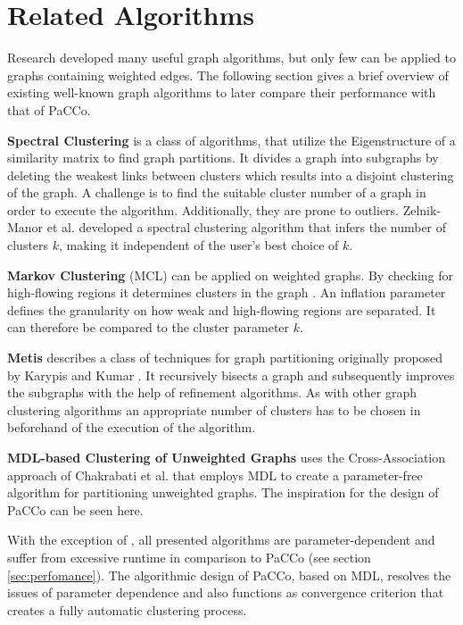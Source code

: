 \documentclass[12pt,journal,compsoc]{IEEEtran}
\numberwithin{equation}{section}
\begin{document}

\section{Related Algorithms}
\label{sec:relatedAlgorithms}
Research developed many useful graph algorithms, but only few can be applied to graphs containing weighted edges. The following section gives a brief overview of existing well-known graph algorithms to later compare their performance with that of PaCCo.

\textbf{Spectral Clustering} is a class of algorithms, that utilize the Eigenstructure of a similarity matrix to find graph partitions. It divides a graph into subgraphs by deleting the weakest links between clusters which results into a disjoint clustering of the graph. A challenge is to find the suitable cluster number of a graph in order to execute the algorithm. Additionally, they are prone to outliers. Zelnik-Manor et al. \cite{zelnik2004self} developed a spectral clustering algorithm that infers the number of clusters $ k $, making it independent of the user's best choice of $ k $.

\textbf{Markov Clustering} (MCL) can be applied on weighted graphs. By checking for high-flowing regions it determines clusters in the graph \cite{dongen2000cluster}. An inflation parameter defines the granularity on how weak and high-flowing regions are separated. It can therefore be compared to the cluster parameter $ k $.

\textbf{Metis} describes a class of techniques for graph partitioning originally proposed by Karypis and Kumar \cite{karypis1998software}. It recursively bisects a graph and subsequently improves the subgraphs with the help of refinement algorithms. As with other graph clustering algorithms an appropriate number of clusters has to be chosen in beforehand of the execution of the algorithm. 


\textbf{MDL-based Clustering of Unweighted Graphs} uses the Cross-Association approach of Chakrabati et al. \cite{chakrabarti2004fully} that employs MDL to create a parameter-free algorithm for partitioning unweighted graphs. The inspiration for the design of PaCCo can be seen here.

With the exception of \cite{chakrabarti2004fully}\cite{zelnik2004self}, all presented algorithms are parameter-dependent and suffer from excessive runtime in comparison to PaCCo (see section \ref{sec:perfomance}). The algorithmic design of PaCCo, based on MDL, resolves the issues of parameter dependence and also functions as convergence criterion that creates a fully automatic clustering process.
\end{document}
